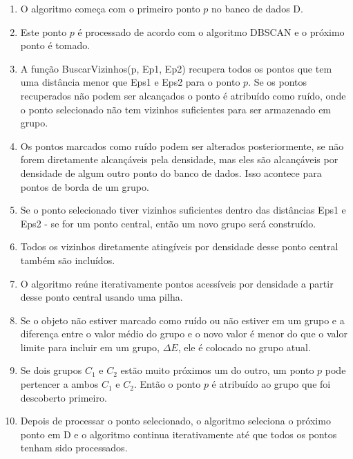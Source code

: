 \begin{enumerate}
	\item O algoritmo começa com o primeiro ponto ${p}$ no banco de dados D.
	\item Este ponto ${p}$ é processado de acordo com o algoritmo \acrshort{DBSCAN} e o próximo ponto é tomado.
	\item A função BuscarVizinhos(p, Ep1, Ep2) recupera todos os pontos que tem uma distância menor que Eps1 e Eps2 para o ponto ${p}$. Se os pontos recuperados não podem ser alcançados o ponto é atribuído como ruído, onde o ponto selecionado não tem vizinhos suficientes para ser armazenado em grupo.
	\item Os pontos marcados como ruído podem ser alterados posteriormente, se não forem diretamente alcançáveis pela densidade, mas eles são alcançáveis por densidade de algum outro ponto do banco de dados. Isso acontece para pontos de borda de um grupo.
	\item Se o ponto selecionado tiver vizinhos suficientes dentro das distâncias Eps1 e Eps2 - se for um ponto central, então um novo grupo será construído.
	\item Todos os vizinhos diretamente atingíveis por densidade desse ponto central também são incluídos.
	\item O algoritmo reúne iterativamente pontos acessíveis por densidade a partir desse ponto central usando uma pilha.
	\item Se o objeto não estiver marcado como ruído ou não estiver em um grupo e a diferença entre o valor médio do grupo e o novo valor é menor do que o valor limite para incluir em um grupo, ${\Delta E}$, ele é colocado no grupo atual.
	\item Se dois grupos ${C_1}$ e ${C_2}$ estão muito próximos um do outro, um ponto ${p}$ pode pertencer a ambos ${C_1}$ e ${C_2}$. Então o ponto ${p}$ é atribuído ao grupo que foi descoberto primeiro.
	\item Depois de processar o ponto selecionado, o algoritmo seleciona o próximo ponto em D e o algoritmo continua iterativamente até que todos os pontos tenham sido processados.
\end{enumerate}

